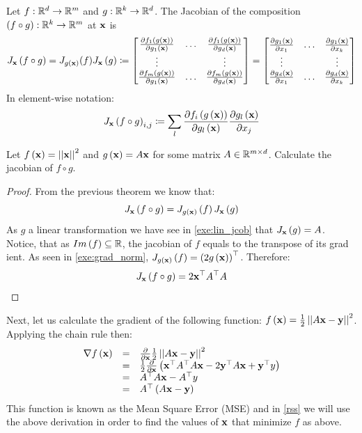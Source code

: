 \begin{theorem}
Let $f:\mathbb{R}^d\rightarrow\mathbb{R}^m$ and $g:\mathbb{R}^k\rightarrow\mathbb{R}^d$. The Jacobian of the composition $\left(f\circ g\right):\mathbb{R}^k\rightarrow\mathbb{R}^m$ at $\mathbf{x}$ is 
$$
J_{\mathbf{x}}\left(f\circ g\right) = J_{g\left(\mathbf{x}\right)}(f)J_{\mathbf{x}}\left(g\right) 
\coloneqq\begin{bmatrix}
	\frac{\partial f_1\left(g\left(\mathbf{x}\right)\right)}{\partial g_1\left(\mathbf{x}\right)} & \ldots & \frac{\partial f_1\left(g\left(\mathbf{x}\right)\right)}{\partial g_d\left(\mathbf{x}\right)}\\
	\vdots &  & \vdots\\
	\frac{\partial f_m\left(g\left(\mathbf{x}\right)\right)}{\partial g_1\left(\mathbf{x}\right)} & \ldots & \frac{\partial f_m\left(g\left(\mathbf{x}\right)\right)}{\partial g_d\left(\mathbf{x}\right)}
\end{bmatrix}
=\begin{bmatrix}\frac{\partial g_1\left(\mathbf{x}\right)}{\partial x_1} & \ldots & \frac{\partial g_1\left(\mathbf{x}\right)}{\partial x_k}\\
	\vdots &  & \vdots\\
	\frac{\partial g_d\left(\mathbf{x}\right)}{\partial x_1} & \ldots & \frac{\partial g_d\left(\mathbf{x}\right)}{\partial x_k}
\end{bmatrix}
$$
In element-wise notation:  $$J_{\mathbf{x}}\left(f\circ g\right)_{i,j} \coloneqq \sum_l\frac{\partial f_i\left(g\left(\mathbf{x}\right)\right)}{\partial g_l\left(\mathbf{x}\right)}  \frac{\partial g_l\left(\mathbf{x}\right)}{\partial x_j} $$
\end{theorem}

\begin{exercise}
Let $f\left(\mathbf{x}\right)=\left|\left| \mathbf{x}\right|\right|^2$ and $g\left(\mathbf{x}\right)=A\mathbf{x}$ for some matrix $A\in\mathbb{R}^{m\times d}$. Calculate the jacobian of $f\circ g$.
\end{exercise}
\begin{proof}
From the previous theorem we know that:
$$ J_{\mathbf{x}}\left(f\circ g\right) = J_{g\left(\mathbf{x}\right)}\left(f\right)J_{\mathbf{x}}\left(g\right)$$
As $g$ a linear transformation we have see in \autoref{exe:lin_jcob} that $J_{\mathbf{x}}\left(g\right)=A$. Notice, that as $Im\left(f\right)\subseteq \mathbb{R}$, the jacobian of $f$ equals to the transpose of its grad	ient. As seen in \autoref{exe:grad_norm}, $J_{g\left(\mathbf{x}\right)}\left(f\right)=\left(2g\left(\mathbf{x}\right)\right)^\top$. Therefore:
$$ J_{\mathbf{x}}\left(f\circ g\right) = 2\mathbf{x}^\top A^\top A$$
\end{proof}

Next, let us calculate the gradient of the following function: $f\left(\mathbf{x}\right) = \frac{1}{2} \left|\left| A\mathbf{x}-\mathbf{y}\right|\right|^2$. Applying the chain rule then:
$$ 
\begin{array}{ccl}
	\nabla f\left(\mathbf{x}\right) & = & \frac{\partial}{\partial \mathbf{x}}\frac{1}{2}\left|\left| A\mathbf{x}-\mathbf{y}\right|\right|^2  \\
	& = & \frac{1}{2}\frac{\partial}{\partial \mathbf{x}}\left(\mathbf{x}^\top A^\top A \mathbf{x} - 2\mathbf{y}^\top A\mathbf{x} + \mathbf{y}^\top y\right) \\
	& = & A^\top A \mathbf{x} - A^\top y \\ 
	& = & A^\top\left(A\mathbf{x}-\mathbf{y}\right)
\end{array}$$
This function is known as the Mean Square Error (MSE) and in \autoref{rss} we will use the above derivation in order to find the values of $\mathbf{x}$ that minimize $f$ as above.

